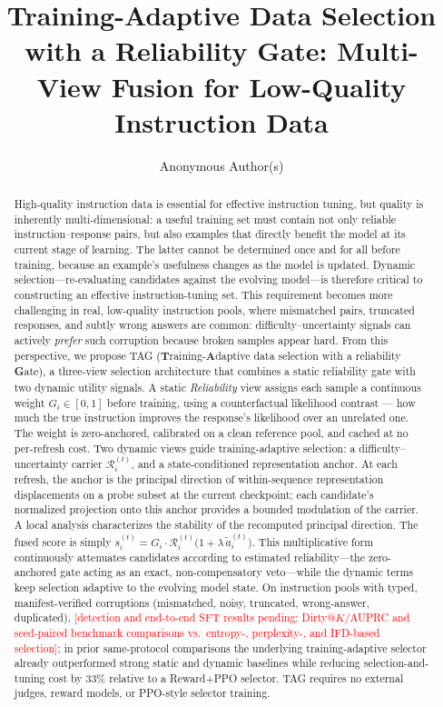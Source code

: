 \documentclass[sigconf,anonymous,review]{acmart}
\newcommand{\STATUS}[1]{\textcolor{red}{[#1]}}
\begin{document}
\title{Training-Adaptive Data Selection with a Reliability Gate:
       Multi-View Fusion for Low-Quality Instruction Data}

\author{Anonymous Author(s)}

\begin{abstract}
High-quality instruction data is essential for effective instruction
tuning, but quality is inherently multi-dimensional: a useful
training set must contain not only reliable instruction--response
pairs, but also examples that directly benefit the model at its
current stage of learning. The latter cannot be determined once and
for all before training, because an example's usefulness changes as
the model is updated. Dynamic selection---re-evaluating candidates
against the evolving model---is therefore critical to constructing
an effective instruction-tuning set. This requirement becomes more
challenging in real, low-quality instruction pools, where mismatched
pairs, truncated responses, and subtly wrong answers are common:
difficulty--uncertainty signals can actively \emph{prefer} such
corruption because broken samples appear hard. From this perspective,
we propose \textsc{TAG} (\textbf{T}raining-\textbf{A}daptive data
selection with a reliability \textbf{G}ate), a three-view selection
architecture that combines a static reliability gate with two
dynamic utility signals. A static \emph{Reliability} view assigns
each sample a continuous weight \(G_i\in[0,1]\) before training,
using a counterfactual likelihood contrast --- how much the true
instruction improves the response's likelihood over an unrelated one.
The weight is zero-anchored, calibrated on a clean reference pool,
and cached at no per-refresh cost. Two
dynamic views guide training-adaptive selection: a
difficulty--uncertainty carrier \(\mathcal{R}_i^{(t)}\), and a
state-conditioned representation anchor. At each refresh, the anchor
is the principal direction of within-sequence representation
displacements on a probe subset at the current checkpoint; each
candidate's normalized projection onto this anchor provides a bounded
modulation of the carrier. A local analysis characterizes the
stability of the recomputed principal direction. The fused
score is simply \(s_i^{(t)} = G_i \cdot \mathcal{R}_i^{(t)}
\bigl(1+\lambda\,\widetilde a_i^{(t)}\bigr)\). This
multiplicative form continuously attenuates candidates according to
estimated reliability---the zero-anchored gate acting as an exact,
non-compensatory veto---while the dynamic terms keep selection
adaptive to the evolving model state. On
instruction pools with typed, manifest-verified corruptions
(mismatched, noisy, truncated, wrong-answer, duplicated),
\STATUS{detection and end-to-end SFT results pending: Dirty@\(K\)/AUPRC
and seed-paired benchmark comparisons vs.\ entropy-, perplexity-,
and IFD-based selection}; in prior same-protocol comparisons the
underlying training-adaptive selector already outperformed strong
static and dynamic baselines while reducing
selection-and-tuning cost by 33\% relative to a Reward+PPO selector.
\textsc{TAG} requires no external judges, reward models, or
PPO-style selector training.
\end{abstract}
\end{document}
